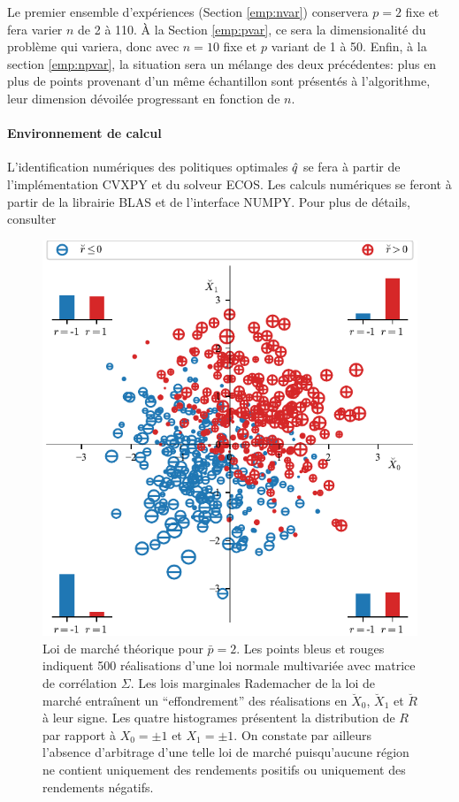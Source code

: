 Le premier ensemble d'expériences (Section \ref{emp:nvar}) conservera $p=2$ fixe et fera
varier $n$ de 2 à 110. À la Section \ref{emp:pvar}, ce sera la dimensionalité du problème
qui variera, donc avec $n=10$ fixe et $p$ variant de 1 à 50. Enfin, à la section
\ref{emp:npvar}, la situation sera un mélange des deux précédentes: plus en plus de points
provenant d'un même échantillon sont présentés à l'algorithme, leur dimension dévoilée
progressant en fonction de $n$.



\paragraph{Environnement de calcul}

L'identification numériques des politiques optimales $\hat q$ se fera à partir de
l'implémentation CVXPY\cite{cvxpy} et du solveur ECOS\cite{ecos}. Les calculs numériques
se feront à partir de la librairie BLAS et de l'interface NUMPY. Pour plus de détails,
consulter 

\newpage



\begin{figure}[ht]
  \centering
  \includegraphics[width=\textwidth]{../experiments/fig/copula.pdf}
  \caption[Loi de marché]{Loi de marché théorique pour $\bar p = 2$. Les points bleus et
    rouges indiquent 500 réalisations d'une loi normale multivariée avec matrice de
    corrélation $\Sigma$. Les lois marginales Rademacher de la loi de marché entraînent un
    ``effondrement'' des réalisations en $\breve{X}_0$, $\breve{X}_1$ et $\breve{R}$ à
    leur signe. Les quatre histogrames présentent la distribution de $R$ par rapport à
    $X_0=\pm1$ et $X_1=\pm1$. On constate par ailleurs l'absence d'arbitrage d'une telle
    loi de marché puisqu'aucune région ne contient uniquement des rendements positifs ou
    uniquement des rendements négatifs.}
  \label{fig_copula}
\end{figure}



